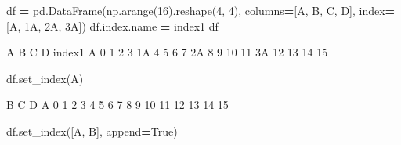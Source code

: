 \documentclass[
]{book}
\newenvironment{Shaded}{\begin{snugshade}}{\end{snugshade}}
\newcommand{\DecValTok}[1]{\textcolor[rgb]{0.00,0.00,0.81}{#1}}
\newcommand{\NormalTok}[1]{#1}
\newcommand{\OperatorTok}[1]{\textcolor[rgb]{0.81,0.36,0.00}{\textbf{#1}}}
\newcommand{\StringTok}[1]{\textcolor[rgb]{0.31,0.60,0.02}{#1}}
\newcommand{\VariableTok}[1]{\textcolor[rgb]{0.00,0.00,0.00}{#1}}
\begin{document}
\begin{Shaded}
\begin{Highlighting}[]
\NormalTok{df }\OperatorTok{=}\NormalTok{ pd.DataFrame(np.arange(}\DecValTok{16}\NormalTok{).reshape(}\DecValTok{4}\NormalTok{, }\DecValTok{4}\NormalTok{),}
\NormalTok{                  columns}\OperatorTok{=}\NormalTok{[}\StringTok{\textquotesingle{}A\textquotesingle{}}\NormalTok{, }\StringTok{\textquotesingle{}B\textquotesingle{}}\NormalTok{, }\StringTok{\textquotesingle{}C\textquotesingle{}}\NormalTok{, }\StringTok{\textquotesingle{}D\textquotesingle{}}\NormalTok{],}
\NormalTok{                  index}\OperatorTok{=}\NormalTok{[}\StringTok{\textquotesingle{}A\textquotesingle{}}\NormalTok{, }\StringTok{\textquotesingle{}1A\textquotesingle{}}\NormalTok{, }\StringTok{\textquotesingle{}2A\textquotesingle{}}\NormalTok{, }\StringTok{\textquotesingle{}3A\textquotesingle{}}\NormalTok{])}
\NormalTok{df.index.name }\OperatorTok{=} \StringTok{\textquotesingle{}index1\textquotesingle{}}
\NormalTok{df}
\end{Highlighting}
\end{Shaded}

\begin{Shaded}
\begin{Highlighting}[]
\NormalTok{         A   B   C   D}
\NormalTok{index1                }
\NormalTok{A        0   1   2   3}
\NormalTok{1A       4   5   6   7}
\NormalTok{2A       8   9  10  11}
\NormalTok{3A      12  13  14  15}
\end{Highlighting}
\end{Shaded}

\begin{Shaded}
\begin{Highlighting}[]
\NormalTok{df.set\_index(}\StringTok{\textquotesingle{}A\textquotesingle{}}\NormalTok{)}
\end{Highlighting}
\end{Shaded}

\begin{Shaded}
\begin{Highlighting}[]
\NormalTok{     B   C   D}
\NormalTok{A             }
\NormalTok{0    1   2   3}
\NormalTok{4    5   6   7}
\NormalTok{8    9  10  11}
\NormalTok{12  13  14  15}
\end{Highlighting}
\end{Shaded}

\begin{Shaded}
\begin{Highlighting}[]
\NormalTok{df.set\_index([}\StringTok{\textquotesingle{}A\textquotesingle{}}\NormalTok{, }\StringTok{\textquotesingle{}B\textquotesingle{}}\NormalTok{], append}\OperatorTok{=}\VariableTok{True}\NormalTok{)}
\end{Highlighting}
\end{Shaded}
\end{document}
